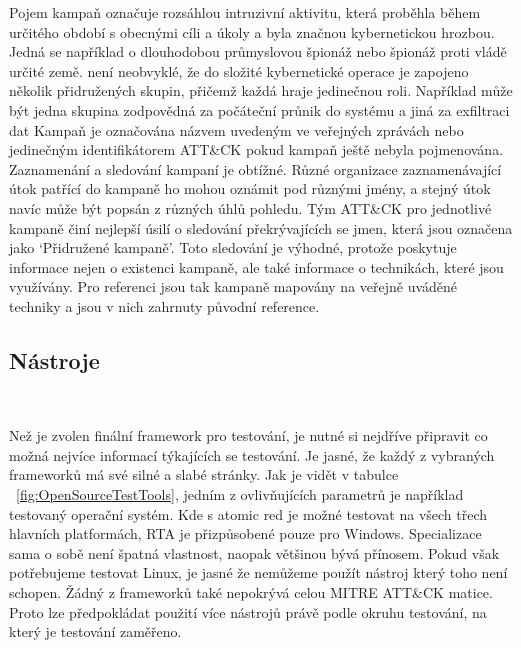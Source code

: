 Pojem kampaň označuje rozsáhlou intruzivní aktivitu, která proběhla během určitého období s obecnými cíli a úkoly a byla značnou kybernetickou hrozbou.
Jedná se například o dlouhodobou průmyslovou špionáž nebo špionáž proti vládě určité země.
není neobvyklé, že do složité kybernetické operace je zapojeno několik přidružených skupin, přičemž každá hraje jedinečnou roli.
Například může být jedna skupina zodpovědná za počáteční průnik do systému a jiná za exfiltraci dat
Kampaň je označována názvem uvedeným ve veřejných zprávách nebo jedinečným identifikátorem ATT\&CK pokud kampaň ještě nebyla pojmenována.
Zaznamenání a sledování kampaní je obtížné.
Různé organizace zaznamenávající útok patřící do kampaně ho mohou oznámit pod různými jmény, a stejný útok navíc může být popsán z různých úhlů pohledu.
Tým ATT\&CK pro jednotlivé kampaně činí nejlepší úsilí o sledování překrývajících se jmen, která jsou označena jako `Přidružené kampaně'.
Toto sledování je výhodné, protože poskytuje informace nejen o existenci kampaně, ale také informace o technikách, které jsou využívány.
Pro referenci jsou tak kampaně mapovány na veřejně uváděné techniky a jsou v nich zahrnuty původní reference.\cite{Mitre_campaigns}

\subsection{Nástroje}\label{subsec:nastroje}
~

Než je zvolen finální framework pro testování, je nutné si nejdříve připravit co možná nejvíce informací týkajících se testování.
Je jasné, že každý z vybraných frameworků má své silné a slabé stránky.
Jak je vidět v tabulce ~\ref{fig:OpenSourceTestTools}, jedním z ovlivňujících parametrů je například testovaný operační systém.
Kde s atomic red je možné testovat na všech třech hlavních platformách, \ac{RTA} je přizpůsobené pouze pro Windows.
Specializace sama o sobě není špatná vlastnost, naopak většinou bývá přínosem.
Pokud však potřebujeme testovat Linux, je jasné že nemůžeme použít nástroj který toho není schopen.
Žádný z frameworků také nepokrývá celou MITRE ATT\&CK matice.
Proto lze předpokládat použití více nástrojů právě podle okruhu testování, na který je testování zaměřeno.

